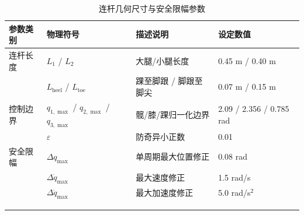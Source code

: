 \begin{table}[htbp]
\centering
\caption{连杆几何尺寸与安全限幅参数}
\begin{tabular}{lllp{4cm}}
\toprule
参数类别 & 物理符号 & 描述说明 & 设定数值 \\
\midrule
连杆长度 & $L_1$ / $L_2$ & 大腿/小腿长度 & 0.45 m / 0.40 m \\
 & $L_{\mathrm{heel}}$ / $L_{\mathrm{toe}}$ & 踝至脚跟 / 脚跟至脚尖 & 0.07 m / 0.15 m \\
控制边界 & $q_{1,\max}$ / $q_{2,\max}$ / $q_{3,\max}$ & 髋/膝/踝归一化边界 & 2.09 / 2.356 / 0.785 rad \\
 & $\varepsilon$ & 防奇异小正数 & 0.01 \\
安全限幅 & $\Delta q_{\max}$ & 单周期最大位置修正 & 0.08 rad \\
 & $\Delta\dot{q}_{\max}$ & 最大速度修正 & 1.5 rad/s \\
 & $\Delta\ddot{q}_{\max}$ & 最大加速度修正 & 5.0 rad/s$^2$ \\
 &  &  &  \\
 &  &  &  \\
 &  &  &  \\
\bottomrule
\end{tabular}
\end{table}
